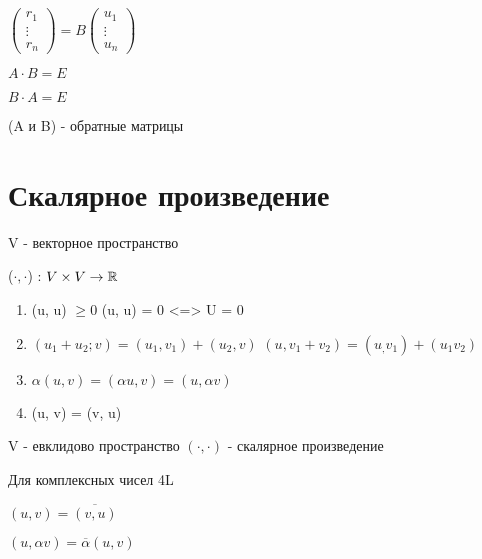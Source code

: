 $\left(
    \begin{array}{c}
        r_1\\
        \vdots\\
        r_n
    \end{array}
    \right) = B \left(
        \begin{array}{c}
            u_1\\
            \vdots\\
            u_n
        \end{array}
        \right)$

$A \cdot B = E$

$B \cdot A = E$

(A и B) - обратные матрицы

\section{Скалярное произведение}

\begin{definition}
    V - векторное пространство

    ($\cdot, \cdot$) : $V \times V \to \mathbb{R}$

    \begin{enumerate}
        \item (u, u) $\geq 0$
        (u, u) = 0 <=> U = 0

        \item $(u_1 + u_2; v) = (u_1, v_1) + (u_2, v)$
        $(u, v_1 + v_2) = (u_, v_1) + (u_1 v_2)$

        \item $\alpha(u, v) = (\alpha u, v) = (u, \alpha v)$
        \item (u, v) = (v, u)
    \end{enumerate}

    V - евклидово пространство
    $(\cdot, \cdot)$ - скалярное произведение
\end{definition}

Для комплексных чисел 4L

$(u, v) = \overline{(v, u)}$

$(u, \alpha v) = \overline{\alpha} (u, v)$


